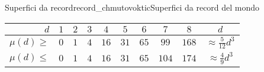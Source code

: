 \begin{surferIntroPage}{Superfici da record}{record_chmutovoktic}{Superfici da record del mondo}
   \begin{center}
      \begin{tabular}{r|cccccccc|c}
        $d$ & $1$ & $2$ & $3$ & $4$ & $5$ & $6$ & $7$ & $8$ & $d$\\
        \hline
        \hline
        \rule{0pt}{1.2em}$\mu(d)\ge$ & $0$ & $1$ & $4$ & $16$ & $31$ & $65$ &
        $99$ & $168$ & 
        $\approx \frac{5}{12}d^3$\\[0.3em]
        \hline
        \rule{0pt}{1.2em}$\mu(d)\le$ & $0$ & $1$ & $4$ & $16$ & $31$ & $65$ &
        $104$ & $174$ & $\approx \frac{4}{9}d^3$
      \end{tabular}
    \end{center}
\end{surferIntroPage}
